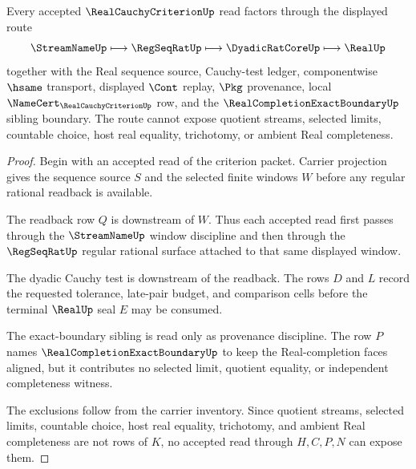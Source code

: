 \begin{theorem}
\label{thm:real-cauchy-criterion-regular-readback-route}
Every accepted $\RealCauchyCriterionUp$ read factors through the displayed route
$$
\StreamNameUp \longmapsto \RegSeqRatUp \longmapsto \DyadicRatCoreUp \longmapsto \RealUp
$$
together with the Real sequence source, Cauchy-test ledger, componentwise $\hsame$ transport, displayed $\Cont$ replay, $\Pkg$ provenance, local $\NameCert_{\RealCauchyCriterionUp}$ row, and the $\RealCompletionExactBoundaryUp$ sibling boundary. The route cannot expose quotient streams, selected limits, countable choice, host real equality, trichotomy, or ambient Real completeness.
\end{theorem}
\begin{proof}
Begin with an accepted read of the criterion packet. Carrier projection gives the sequence source $S$ and the selected finite windows $W$ before any regular rational readback is available.

The readback row $Q$ is downstream of $W$. Thus each accepted read first passes through the $\StreamNameUp$ window discipline and then through the $\RegSeqRatUp$ regular rational surface attached to that same displayed window.

The dyadic Cauchy test is downstream of the readback. The rows $D$ and $L$ record the requested tolerance, late-pair budget, and comparison cells before the terminal $\RealUp$ seal $E$ may be consumed.

The exact-boundary sibling is read only as provenance discipline. The row $P$ names $\RealCompletionExactBoundaryUp$ to keep the Real-completion faces aligned, but it contributes no selected limit, quotient equality, or independent completeness witness.

The exclusions follow from the carrier inventory. Since quotient streams, selected limits, countable choice, host real equality, trichotomy, and ambient Real completeness are not rows of $K$, no accepted read through $H,C,P,N$ can expose them.
\end{proof}

